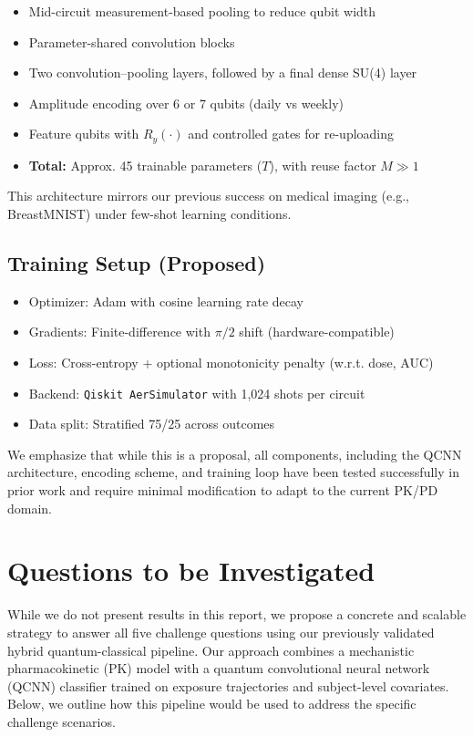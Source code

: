 \documentclass[11pt]{article}
\begin{document}
\begin{itemize}
\begin{itemize} \item Mid-circuit measurement-based pooling to reduce qubit width \item Parameter-shared convolution blocks \item Two convolution–pooling layers, followed by a final dense SU(4) layer \item Amplitude encoding over 6 or 7 qubits (daily vs weekly) \item Feature qubits with $R_y(\cdot)$ and controlled gates for re-uploading \item \textbf{Total:} Approx. 45 trainable parameters ($T$), with reuse factor $M \gg 1$ \end{itemize}

This architecture mirrors our previous success on medical imaging (e.g., BreastMNIST) under few-shot learning conditions.

\subsection{Training Setup (Proposed)}

\begin{itemize} \item Optimizer: Adam with cosine learning rate decay \item Gradients: Finite-difference with $\pi/2$ shift (hardware-compatible) \item Loss: Cross-entropy + optional monotonicity penalty (w.r.t. dose, AUC) \item Backend: \texttt{Qiskit AerSimulator} with 1,024 shots per circuit \item Data split: Stratified 75/25 across outcomes \end{itemize}

We emphasize that while this is a proposal, all components, including the QCNN architecture, encoding scheme, and training loop have been tested   successfully in prior work and require minimal modification to adapt to the current PK/PD domain.

\section{Questions to be Investigated}

While we do not present results in this report, we propose a concrete and scalable strategy to answer all five challenge questions using our previously validated hybrid quantum-classical pipeline. Our approach combines a mechanistic pharmacokinetic (PK) model with a quantum convolutional neural network (QCNN) classifier trained on exposure trajectories and subject-level covariates. Below, we outline how this pipeline would be used to address the specific challenge scenarios.


\end{itemize}
\end{document}
